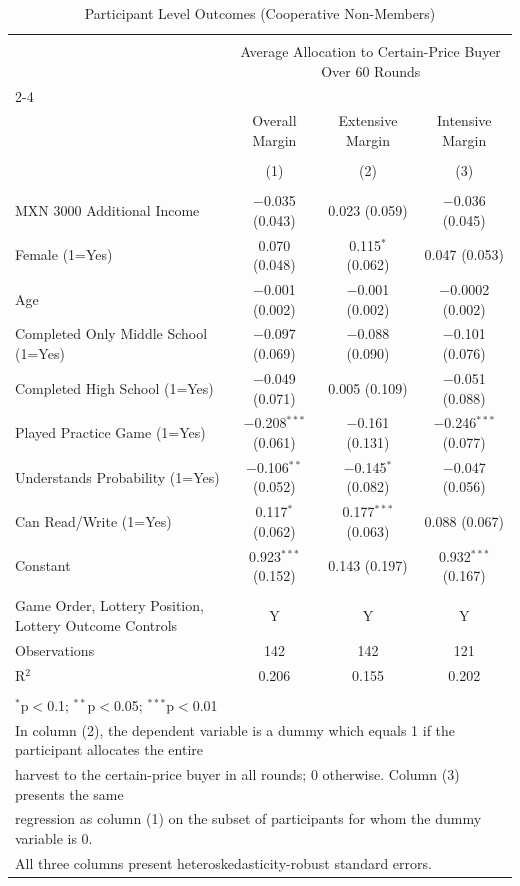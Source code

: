 
\begin{table}[!htbp] \centering 
  \caption{Participant Level Outcomes (Cooperative Non-Members)} 
  \label{participant_level_outcomes_coop_no} 
\begin{tabular}{@{\extracolsep{5pt}}lccc} 
\\[-1.8ex]\hline 
\hline \\[-1.8ex] 
 & \multicolumn{3}{c}{Average Allocation to Certain-Price Buyer Over 60 Rounds} \\ 
\cline{2-4} 
\\[-1.8ex] & Overall Margin & Extensive Margin & Intensive Margin \\ 
\\[-1.8ex] & (1) & (2) & (3)\\ 
\hline \\[-1.8ex] 
 MXN 3000 Additional Income & $-$0.035 (0.043) & 0.023 (0.059) & $-$0.036 (0.045) \\ 
  Female (1=Yes) & 0.070 (0.048) & 0.115$^{*}$ (0.062) & 0.047 (0.053) \\ 
  Age & $-$0.001 (0.002) & $-$0.001 (0.002) & $-$0.0002 (0.002) \\ 
  Completed Only Middle School (1=Yes) & $-$0.097 (0.069) & $-$0.088 (0.090) & $-$0.101 (0.076) \\ 
  Completed High School (1=Yes) & $-$0.049 (0.071) & 0.005 (0.109) & $-$0.051 (0.088) \\ 
  Played Practice Game (1=Yes) & $-$0.208$^{***}$ (0.061) & $-$0.161 (0.131) & $-$0.246$^{***}$ (0.077) \\ 
  Understands Probability (1=Yes) & $-$0.106$^{**}$ (0.052) & $-$0.145$^{*}$ (0.082) & $-$0.047 (0.056) \\ 
  Can Read/Write (1=Yes) & 0.117$^{*}$ (0.062) & 0.177$^{***}$ (0.063) & 0.088 (0.067) \\ 
  Constant & 0.923$^{***}$ (0.152) & 0.143 (0.197) & 0.932$^{***}$ (0.167) \\ 
 \hline \\[-1.8ex] 
Game Order, Lottery Position, Lottery Outcome Controls & Y & Y & Y \\ 
Observations & 142 & 142 & 121 \\ 
R$^{2}$ & 0.206 & 0.155 & 0.202 \\ 
\hline 
\hline \\[-1.8ex] 
\multicolumn{4}{l}{$^{*}$p$<$0.1; $^{**}$p$<$0.05; $^{***}$p$<$0.01} \\ 
\multicolumn{4}{l}{In column (2), the dependent variable is a dummy which equals 1 if the participant allocates the entire} \\ 
\multicolumn{4}{l}{harvest to the certain-price buyer in all rounds; 0 otherwise. Column (3) presents the same} \\ 
\multicolumn{4}{l}{regression as column (1) on the subset of participants for whom the dummy variable is 0.} \\ 
\multicolumn{4}{l}{All three columns present heteroskedasticity-robust standard errors.} \\ 
\end{tabular} 
\end{table} 
